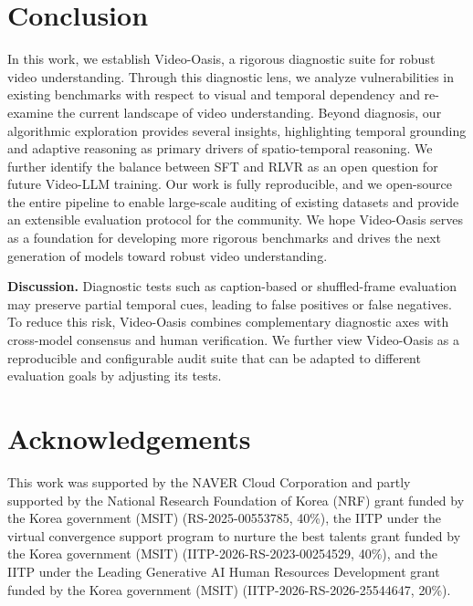 \documentclass[runningheads]{llncs}
\begin{document}
\section{Conclusion}
{
    In this work, we establish Video-Oasis, a rigorous diagnostic suite for robust video understanding. 
    Through this diagnostic lens, we analyze vulnerabilities in existing benchmarks with respect to visual and temporal dependency and re-examine the current landscape of video understanding.
    Beyond diagnosis, our algorithmic exploration provides several insights, highlighting temporal grounding and adaptive reasoning as primary drivers of spatio-temporal reasoning. 
    We further identify the balance between SFT and RLVR as an open question for future Video-LLM training.
    Our work is fully reproducible, and we open-source the entire pipeline to enable large-scale auditing of existing datasets and provide an extensible evaluation protocol for the community.
    We hope Video-Oasis serves as a foundation for developing more rigorous benchmarks and drives the next generation of models toward robust video understanding.
    
    \noindent\textbf{Discussion.}
    Diagnostic tests such as caption-based or shuffled-frame evaluation may preserve partial temporal cues, leading to false positives or false negatives.
    To reduce this risk, Video-Oasis combines complementary diagnostic axes with cross-model consensus and human verification.
    We further view Video-Oasis as a reproducible and configurable audit suite that can be adapted to different evaluation goals by adjusting its tests.

}

\section*{Acknowledgements}
{
    This work was supported by the NAVER Cloud Corporation and partly supported by the National Research Foundation of Korea (NRF) grant funded by the Korea government (MSIT) (RS-2025-00553785, 40\%), the IITP under the virtual convergence support program to nurture the best talents grant funded by the Korea government (MSIT) (IITP-2026-RS-2023-00254529, 40\%), and the IITP under the Leading Generative AI Human Resources Development grant funded by the Korea government (MSIT) (IITP-2026-RS-2026-25544647, 20\%).
}

            

\end{document}
